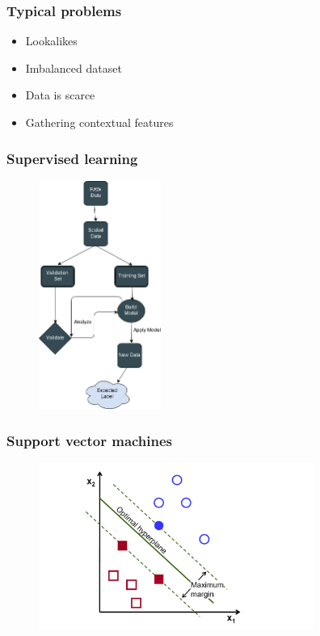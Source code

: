 \documentclass{beamer}
\begin{document}

\begin{frame}
\frametitle{Typical problems}

	\begin{itemize}
		\item Lookalikes
		\item Imbalanced dataset
		\item Data is scarce
		\item Gathering contextual features
	\end{itemize}
	
\end{frame}


\begin{frame}
\frametitle{Supervised learning}

	\begin{figure}
		\centering
    	\includegraphics[width=40mm,scale=1]{./img/SL.png}
	\end{figure}

\end{frame}


\begin{frame}
\frametitle{Support vector machines}

	\begin{figure}
		\centering
    	\includegraphics[width=90mm,scale=1]{./img/SVM.png}
	\end{figure}

\end{frame}
\end{document}
